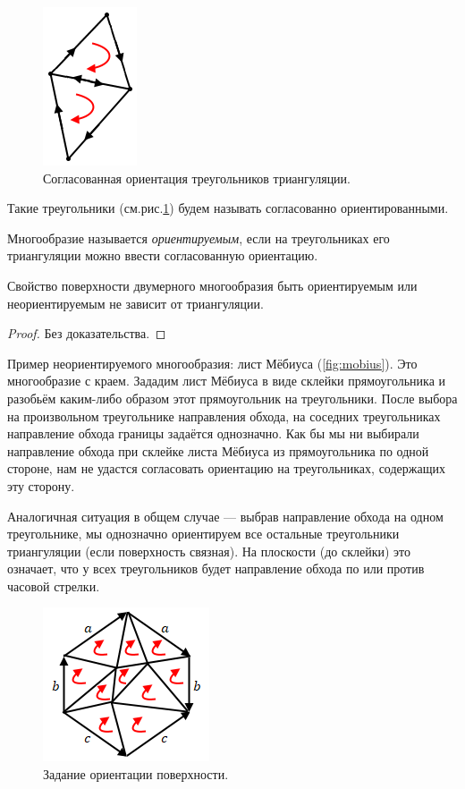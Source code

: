 \begin{figure}[htbp]
    \centering
    \includegraphics[scale=0.7]{images/c11.2.png}
    \caption{Согласованная ориентация треугольников триангуляции.}
    \label{fig:c11.2}
\end{figure}

Такие треугольники (см.рис.\ref{fig:c11.2}) будем называть согласованно ориентированными.

\begin{definition}
    Многообразие называется \textit{ориентируемым}, если на треугольниках его триангуляции можно ввести согласованную ориентацию.
\end{definition} 

\begin{statement}
    Свойство поверхности двумерного многообразия быть ориентируемым или неориентируемым не зависит от триангуляции.
\end{statement} 
\begin{proof}
    Без доказательства.
\end{proof} 

Пример неориентируемого многообразия: лист Мёбиуса (\ref{fig:mobius}). Это многообразие с краем. Зададим лист Мёбиуса в виде склейки прямоугольника и разобьём каким-либо образом этот прямоугольник на треугольники. После выбора на произвольном треугольнике направления обхода, на соседних треугольниках направление обхода границы задаётся однозначно. Как бы мы ни выбирали направление обхода при склейке листа Мёбиуса из прямоугольника по одной стороне, нам не удастся согласовать ориентацию на треугольниках, содержащих эту сторону.

Аналогичная ситуация в общем случае — выбрав направление обхода на одном треугольнике, мы однозначно ориентируем все остальные треугольники триангуляции (если поверхность связная). На плоскости (до склейки) это означает, что у всех треугольников будет направление обхода по или против часовой стрелки.

\begin{figure}[ht]
    \centering
    \includegraphics[scale=0.7]{images/c11.3.png}
    \caption{Задание ориентации поверхности.}
    \label{fig:c11.3}
\end{figure}

